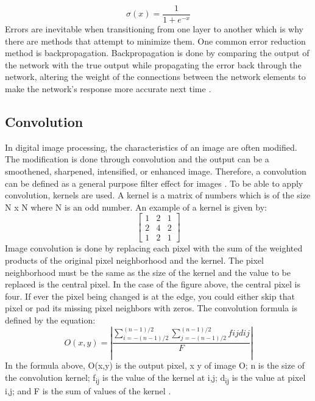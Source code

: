 \documentclass[journal]{./IEEE/IEEEtran}
\begin{document}
\newline
\begin{equation}
\sigma(x) = \frac{1}{1+e^{-x}}
\end{equation}
\newline
\indent Errors are inevitable when transitioning from one layer to another which is why there are methods that attempt to minimize them. One common error reduction method is backpropagation. Backpropagation is done by comparing the output of the network with the true output while propagating the error back through the network, altering the weight of the connections between the network elements to make the network's response more accurate next time \cite{Cross1995}.

\subsection{Convolution}
In digital image processing, the characteristics of an image are often modified. The modification is done through convolution and the output can be a smoothened, sharpened, intensified, or enhanced image. Therefore, a convolution can be defined as a general purpose filter effect for images \cite{Ludwig2007}. To be able to apply convolution, kernels are used. A kernel is a matrix of numbers which is of the size N x N where N is an odd number. An example of a kernel is given by:
\newline
\begin{equation}
\begin{bmatrix}
1&2&1\\ 
2&4&2\\ 
1&2&1 
\end{bmatrix}
\end{equation}
\newline
\indent Image convolution is done by replacing each pixel with the sum of the weighted products of the original pixel neighborhood and the kernel. The pixel neighborhood must be the same as the size of the kernel and the value to be replaced is the central pixel. In the case of the figure above, the central pixel is four. If ever the pixel being changed is at the edge, you could either skip that pixel or pad its missing pixel neighbors with zeros. The convolution formula is defined by the equation:
\newline
\begin{equation}
O(x,y) = \left | \frac{\sum_{i=-(n-1)/2}^{(n-1)/2} \sum_{j=-(n-1)/2}^{(n-1)/2}f{ij}d{ij}}{F} \right |
\end{equation}
\newline
\indent In the formula above, O(x,y) is the output pixel, x y of image O; n is the size of the convolution kernel; f\textsubscript{ij} is the value of the kernel at i,j; d\textsubscript{ij} is the value at pixel i,j; and F is the sum of values of the kernel \cite{AbriolSantos22018}.
\end{document}

